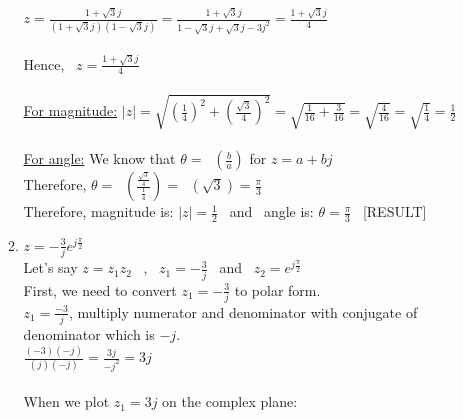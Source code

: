 \documentclass[10pt,a4paper, margin=1in]{article}
\DeclareMathOperator{\taninv}{\tan^{-1}}
\begin{document}
\begin{enumerate}
\begin{enumerate}
    \\
    $z = \frac{1 + \sqrt{3}j}{(1 + \sqrt{3}j)(1 - \sqrt{3}j)} = \frac{1 + \sqrt{3}j}{1 -\sqrt{3}j + \sqrt{3}j - 3j^2} = \frac{1 + \sqrt{3}j}{4}$ \\
    \\
    Hence, \ $z = \frac{1 + \sqrt{3}j}{4}$ \\
    \\
    \underline{For magnitude:} $|z| = \sqrt{(\frac{1}{4})^2 + (\frac{\sqrt{3}}{4})^2} = \sqrt{\frac{1}{16} + \frac{3}{16}} = \sqrt{\frac{4}{16}} = \sqrt{\frac{1}{4}} = \frac{1}{2} $ \\
    \\
    \underline{For angle:} We know that $ \theta = \taninv(\frac{b}{a})$ for $z = a +bj$ \\
    Therefore, $\theta = \taninv(\frac{\frac{\sqrt{3}}{4}}{\frac{1}{4}}) = \taninv(\sqrt{3}) = \frac{\pi}{3}$ \\
    Therefore, magnitude is: $|z| = \frac{1}{2}$ \ and \ angle is: $\theta = \frac{\pi}{3}$ \ [RESULT]
    
    \item %
    $z = -\frac{3}{j}e^{j\frac{\pi}{2}}$  \\
    Let's say $z = z_1z_2$ \ , \ $z_1 = -\frac{3}{j}$ \ and \ $z_2 = e^{j\frac{\pi}{2}}$\\
    First, we need to convert $z_1 = -\frac{3}{j}$ to polar form. \\
    $z_1 = \frac{-3}{j}$, multiply numerator and denominator with conjugate of denominator which is $-j$. \\
    $\frac{(-3)(-j)}{(j)(-j)} = \frac{3j}{-j^2} = 3j$ \\
    \\
    When we plot $z_1 = 3j$ on the complex plane: \\
    
    \begin{figure}[h]
\centering
{}
\end{figure}
\end{enumerate}
\end{enumerate}
\end{document}
